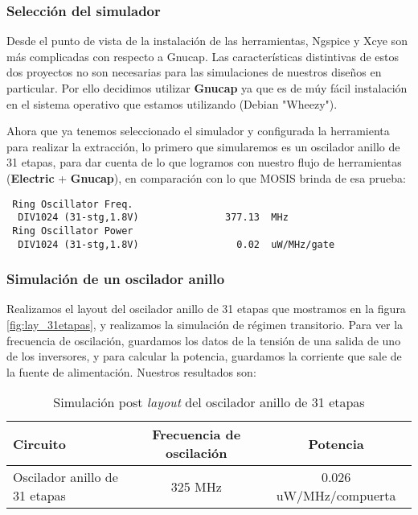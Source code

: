 \subsubsection{Selección del simulador}
Desde el punto de vista de la instalación de las herramientas, Ngspice y Xcye son más complicadas con respecto a Gnucap. Las características distintivas de estos dos proyectos no son necesarias para las simulaciones de nuestros diseños en particular. Por ello decidimos utilizar \textbf{Gnucap} ya que es de múy fácil instalación en el sistema operativo que estamos utilizando (Debian "Wheezy"). 

Ahora que ya tenemos seleccionado el simulador y configurada la herramienta para realizar la extracción, lo primero que simularemos es un oscilador anillo de 31 etapas, para dar cuenta de lo que logramos con nuestro flujo de herramientas (\textbf{Electric} + \textbf{Gnucap}), en comparación con lo que MOSIS brinda de esa prueba:

\begin{footnotesize}
\begin{verbatim}
 Ring Oscillator Freq.                                   
  DIV1024 (31-stg,1.8V)               377.13  MHz        
 Ring Oscillator Power                                   
  DIV1024 (31-stg,1.8V)                 0.02  uW/MHz/gate
\end{verbatim}
\end{footnotesize}

\subsubsection{Simulación de un oscilador anillo}
Realizamos el layout del oscilador anillo de 31 etapas que mostramos en la figura \ref{fig:lay_31etapas}, y realizamos la simulación de régimen transitorio. Para ver la frecuencia de oscilación, guardamos los datos de la tensión de una salida de uno de los inversores, y para calcular la potencia, guardamos la corriente que sale de la fuente de alimentación. Nuestros resultados son:

\begin{table}[h]
\centering
\begin{tabular}{@{}lcc@{}}
\toprule
Circuito	&	Frecuencia de oscilación	&	Potencia \\ \midrule
Oscilador anillo de 31 etapas               & 325 MHz	& 0.026 uW/MHz/compuerta   \\ \bottomrule
\end{tabular}
\caption{Simulación post \emph{layout} del oscilador anillo de 31 etapas}
\label{tab:RO31}
\end{table}

